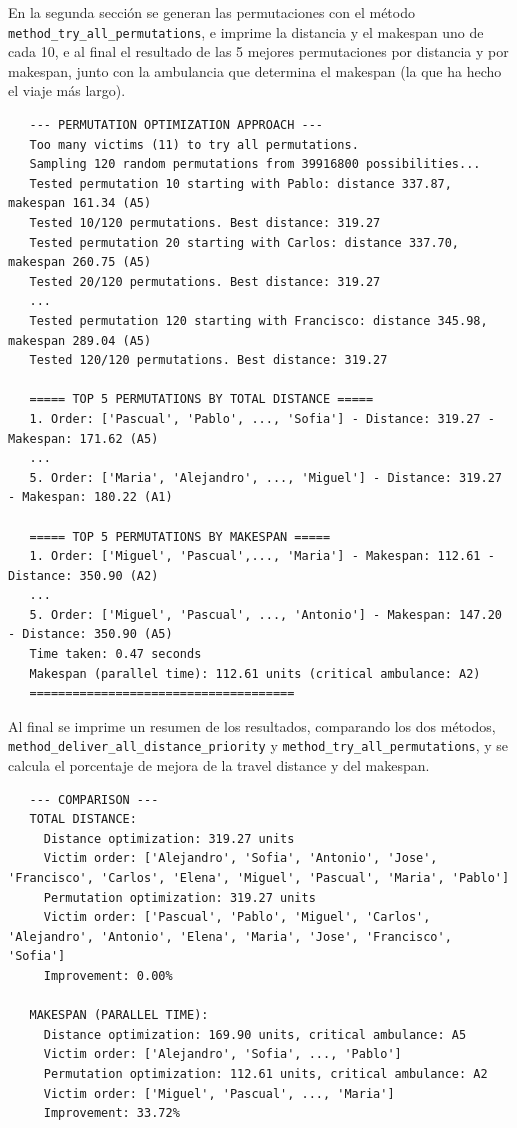 En la segunda sección se generan las permutaciones con el método \lstinline|method_try_all_permutations|, e imprime la distancia y el makespan uno de cada 10, e al final
el resultado de las 5 mejores permutaciones por distancia y por makespan, junto con la ambulancia que determina el makespan (la que ha hecho el viaje más largo).
\begin{verbatim}
   --- PERMUTATION OPTIMIZATION APPROACH ---
   Too many victims (11) to try all permutations.
   Sampling 120 random permutations from 39916800 possibilities...
   Tested permutation 10 starting with Pablo: distance 337.87, makespan 161.34 (A5)
   Tested 10/120 permutations. Best distance: 319.27
   Tested permutation 20 starting with Carlos: distance 337.70, makespan 260.75 (A5)
   Tested 20/120 permutations. Best distance: 319.27
   ...
   Tested permutation 120 starting with Francisco: distance 345.98, makespan 289.04 (A5)
   Tested 120/120 permutations. Best distance: 319.27
   
   ===== TOP 5 PERMUTATIONS BY TOTAL DISTANCE =====
   1. Order: ['Pascual', 'Pablo', ..., 'Sofia'] - Distance: 319.27 - Makespan: 171.62 (A5)
   ...
   5. Order: ['Maria', 'Alejandro', ..., 'Miguel'] - Distance: 319.27 - Makespan: 180.22 (A1)
   
   ===== TOP 5 PERMUTATIONS BY MAKESPAN =====
   1. Order: ['Miguel', 'Pascual',..., 'Maria'] - Makespan: 112.61 - Distance: 350.90 (A2)
   ...
   5. Order: ['Miguel', 'Pascual', ..., 'Antonio'] - Makespan: 147.20 - Distance: 350.90 (A5)
   Time taken: 0.47 seconds
   Makespan (parallel time): 112.61 units (critical ambulance: A2)
   =====================================
\end{verbatim}

Al final se imprime un resumen de los resultados, comparando los dos métodos, \lstinline|method_deliver_all_distance_priority| y \lstinline|method_try_all_permutations|, y se calcula el porcentaje de mejora de la travel distance y del makespan.

\begin{verbatim}
   --- COMPARISON ---
   TOTAL DISTANCE:
     Distance optimization: 319.27 units
     Victim order: ['Alejandro', 'Sofia', 'Antonio', 'Jose', 'Francisco', 'Carlos', 'Elena', 'Miguel', 'Pascual', 'Maria', 'Pablo']
     Permutation optimization: 319.27 units
     Victim order: ['Pascual', 'Pablo', 'Miguel', 'Carlos', 'Alejandro', 'Antonio', 'Elena', 'Maria', 'Jose', 'Francisco', 'Sofia']
     Improvement: 0.00%
   
   MAKESPAN (PARALLEL TIME):
     Distance optimization: 169.90 units, critical ambulance: A5
     Victim order: ['Alejandro', 'Sofia', ..., 'Pablo']
     Permutation optimization: 112.61 units, critical ambulance: A2
     Victim order: ['Miguel', 'Pascual', ..., 'Maria']
     Improvement: 33.72%
\end{verbatim}

